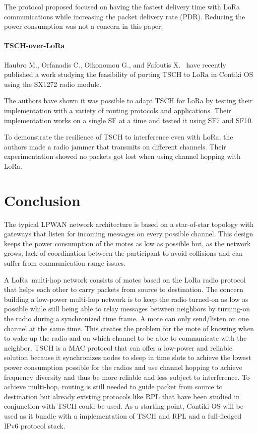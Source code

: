 
The protocol proposed focused on having the fastest delivery time with LoRa
communications while increasing the packet delivery rate (PDR).
Reducing the power consumption was not a concern in this paper.


\paragraph{TSCH-over-LoRa}

Haubro M., Orfanadis C., Oikonomou G., and Fafoutis X.~\cite{tschoverlora}
have recently published a work studying the feasibility of porting TSCH to LoRa
in Contiki OS using the SX1272 radio module.

The authors have shown it was possible to adapt TSCH for LoRa by testing their
implementation with a variety of routing protocols and applications.
Their implementation works on a single SF at a time and tested it using
SF7 and SF10.

To demonstrate the resilience of TSCH to interference even with LoRa, the
authors made a radio jammer that transmits on different channels. Their
experimentation showed no packets got lost when using channel hopping with
LoRa.

\section{Conclusion}

The typical LPWAN network architecture is based on a star-of-star topology
with gateways that listen for incoming messages on every possible channel.
This design keeps the power consumption of the motes as low as possible
but, as the network grows, lack of coordination between the participant to avoid
collisions and can suffer from communication range issues.

A LoRa multi-hop network consists of motes based on the LoRa radio protocol
that helps each other to carry packets from source to destination.
The concern building a low-power multi-hop network is to keep
the radio turned-on as low as possible while still being able to relay
messages between neighbors by turning-on the radio during a synchronized time frame.
A mote can only send/listen on one channel at the same time.
This creates the problem for the mote of knowing when to wake up the radio and
on which channel to be able to communicate with the neighbor.
TSCH is a MAC protocol that
can offer a low-power and reliable solution because it synchronizes nodes
to sleep in time slots to achieve the lowest power consumption possible for the
radios and use channel hopping to achieve frequency diversity and thus be
more reliable and less subject to interference.
To achieve multi-hop, routing is still needed to guide packet from source
to destination but already existing protocols like RPL that have been studied
in conjunction with TSCH could be used.
As a starting point, Contiki OS will be used as it bundle with a
implementation of TSCH and RPL and a full-fledged IPv6 protocol stack.

